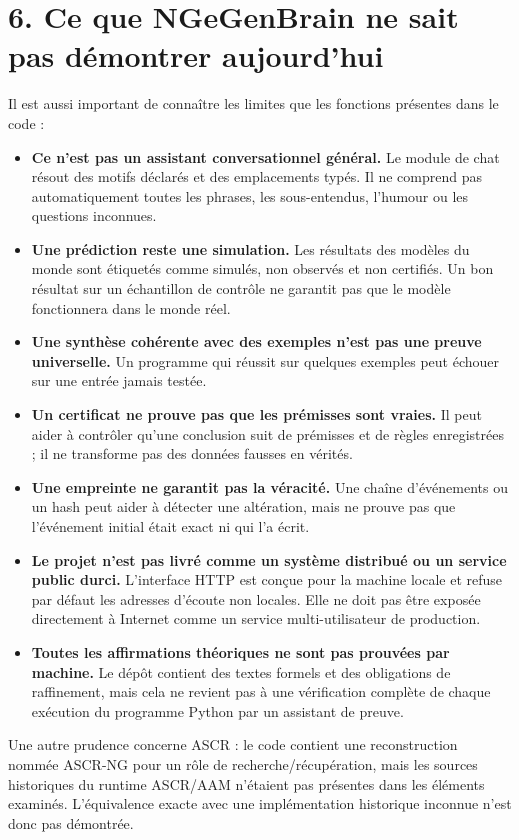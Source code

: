 \documentclass[11pt,a4paper]{article}
\begin{document}
\section*{6. Ce que NGeGenBrain ne sait pas démontrer aujourd'hui}

Il est aussi important de connaître les limites que les fonctions présentes dans le code :
\begin{itemize}
  \item \textbf{Ce n'est pas un assistant conversationnel général.} Le module de chat résout des motifs déclarés et des emplacements typés. Il ne comprend pas automatiquement toutes les phrases, les sous-entendus, l'humour ou les questions inconnues.
  \item \textbf{Une prédiction reste une simulation.} Les résultats des modèles du monde sont étiquetés comme simulés, non observés et non certifiés. Un bon résultat sur un échantillon de contrôle ne garantit pas que le modèle fonctionnera dans le monde réel.
  \item \textbf{Une synthèse cohérente avec des exemples n'est pas une preuve universelle.} Un programme qui réussit sur quelques exemples peut échouer sur une entrée jamais testée.
  \item \textbf{Un certificat ne prouve pas que les prémisses sont vraies.} Il peut aider à contrôler qu'une conclusion suit de prémisses et de règles enregistrées ; il ne transforme pas des données fausses en vérités.
  \item \textbf{Une empreinte ne garantit pas la véracité.} Une chaîne d'événements ou un hash peut aider à détecter une altération, mais ne prouve pas que l'événement initial était exact ni qui l'a écrit.
  \item \textbf{Le projet n'est pas livré comme un système distribué ou un service public durci.} L'interface HTTP est conçue pour la machine locale et refuse par défaut les adresses d'écoute non locales. Elle ne doit pas être exposée directement à Internet comme un service multi-utilisateur de production.
  \item \textbf{Toutes les affirmations théoriques ne sont pas prouvées par machine.} Le dépôt contient des textes formels et des obligations de raffinement, mais cela ne revient pas à une vérification complète de chaque exécution du programme Python par un assistant de preuve.
\end{itemize}

Une autre prudence concerne ASCR : le code contient une reconstruction nommée ASCR-NG pour un rôle de recherche/récupération, mais les sources historiques du runtime ASCR/AAM n'étaient pas présentes dans les éléments examinés. L'équivalence exacte avec une implémentation historique inconnue n'est donc pas démontrée.
\end{document}
